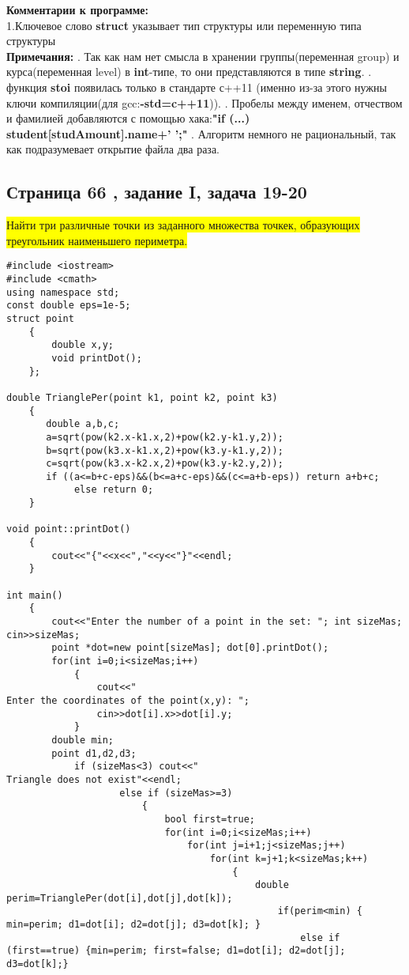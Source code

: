\documentclass[11pt]{article}
\begin{document}
\begin{flushleft}
\textbf{Комментарии к программе:} \\
1.Ключевое слово \textbf{struct} указывает тип структуры или переменную типа структуры\\
\textbf{Примечания:}
. Так как нам нет смысла в хранении группы(переменная group) и курса(переменная level) в \textbf{int}-типе, то они представляются в типе \textbf{string}.
. функция \textbf{stoi} появилась только в стандарте с++11 (именно из-за этого нужны ключи компиляции(для gcc:\textbf{-std=c++11})).
. Пробелы между именем, отчеством и фамилией добавляются с помощью хака:\newline\textbf{"if (...) student[studAmount].name+' ';"}
. Алгоритм немного не рациональный, так как подразумевает открытие файла два раза.

\newpage
\begin{center}
\section{Страница 66 , задание I, задача 19-20 }
\colorbox{yellow}{Найти три различные точки из заданного множества точкек, образующих треугольник наименьшего периметра.}
\end{center}
\fontsize{9}{10}
\begin{lstlisting}
#include <iostream>
#include <cmath>
using namespace std;
const double eps=1e-5;
struct point
	{
		double x,y;
		void printDot();
	};

double TrianglePer(point k1, point k2, point k3)
	{
	   double a,b,c;
	   a=sqrt(pow(k2.x-k1.x,2)+pow(k2.y-k1.y,2));
	   b=sqrt(pow(k3.x-k1.x,2)+pow(k3.y-k1.y,2));
	   c=sqrt(pow(k3.x-k2.x,2)+pow(k3.y-k2.y,2));
	   if ((a<=b+c-eps)&&(b<=a+c-eps)&&(c<=a+b-eps)) return a+b+c;
	   		else return 0;
	}

void point::printDot()
	{
		cout<<"{"<<x<<","<<y<<"}"<<endl;
	}

int main()
	{
		cout<<"Enter the number of a point in the set: "; int sizeMas; cin>>sizeMas;
		point *dot=new point[sizeMas]; dot[0].printDot();
		for(int i=0;i<sizeMas;i++) 
			{ 
				cout<<"
Enter the coordinates of the point(x,y): "; 
				cin>>dot[i].x>>dot[i].y;
			}
		double min;
		point d1,d2,d3;
			if (sizeMas<3) cout<<"
Triangle does not exist"<<endl;
					else if (sizeMas>=3)
						{
							bool first=true; 							
							for(int i=0;i<sizeMas;i++) 
								for(int j=i+1;j<sizeMas;j++) 
									for(int k=j+1;k<sizeMas;k++)
										{
											double perim=TrianglePer(dot[i],dot[j],dot[k]);
												if(perim<min) { min=perim; d1=dot[i]; d2=dot[j]; d3=dot[k]; }
													else if (first==true) {min=perim; first=false; d1=dot[i]; d2=dot[j]; d3=dot[k];}
												

\end{lstlisting}
\end{flushleft}
\end{document}
